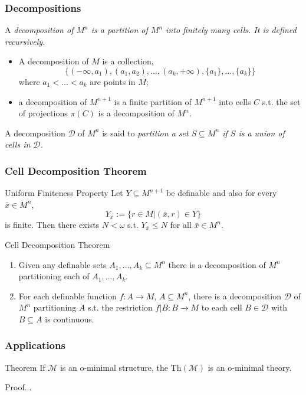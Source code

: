 \begin{frame}[c]\frametitle{Decompositions}
    
	A \em decomposition \em of $M^n$ is a partition of $M^n$ into finitely many cells. It is defined recursively.

	\begin{itemize}
		\item A decomposition of $M$ is a collection,
		$$\{  (-\infty,a_1),(a_1,a_2),\ldots,(a_k,+\infty),\{a_1\},\ldots,\{a_k\} \}$$
		where $a_1<\ldots<a_k$ are points in $M$;
		\item a decomposition of $M^{n+1}$ is a finite partition of $M^{n+1}$ into cells $C$ s.t. the set of projections $\pi(C)$ is a decomposition of $M^n$.
	\end{itemize}

	A decomposition $\mathcal{D}$ of $M^n$ is said to \em partition \em a set $S \subseteq M^n$ if $S$ is a union of cells in $\mathcal{D}$.

\end{frame}

\begin{frame}[c]\frametitle{Cell Decomposition Theorem}
    
	\begin{beamerboxesrounded}[shadow=true]{Uniform Finiteness Property}
		Let $Y \subseteq M^{n+1}$ be definable and also for every $\bar{x} \in M^n$, 
		$$Y_{\bar{x}}:= \{  r \in M | (\bar{x},r) \in Y \}$$ is finite.
		Then there exists $N<\omega$ s.t. $Y_{\bar{x}} \leq N$ for all $\bar{x} \in M^n$.
	\end{beamerboxesrounded}

	\begin{beamerboxesrounded}[shadow=true]{Cell Decomposition Theorem}
		\begin{enumerate}
			\item Given any definable sets $A_1,\ldots,A_k\subseteq M^n$ there is a decomposition of $M^n$ partitioning each of $A_1,\ldots,A_k$.
			\item For each definable function $f:A \to M$, $A \subseteq M^n$, there is a decomposition $\mathcal{D}$ of $M^n$ partitioning $A$ s.t. the restriction $f|B:B\to M$ to each cell $B \in \mathcal{D}$ with $B\subseteq A$ is continuous.
		\end{enumerate}
	\end{beamerboxesrounded}

\end{frame}

\begin{frame}[c]\frametitle{Applications}
    
	\begin{beamerboxesrounded}[shadow=true]{Theorem}
		If $\mathcal{M}$ is an o-minimal structure, the $\text{Th}(\mathcal{M})$ is an o-minimal theory.
	\end{beamerboxesrounded}
	Proof...

\end{frame}